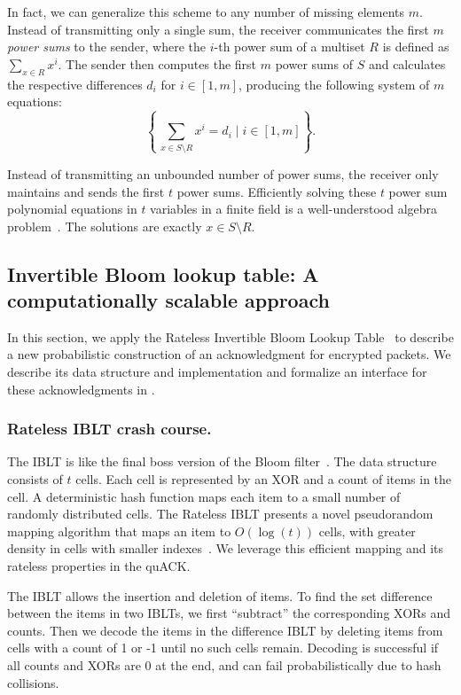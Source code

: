 In fact, we can generalize this scheme to any number of missing elements $m$.
Instead of transmitting only a single sum, the receiver communicates
the first $m$ \emph{power sums} to the sender, where the $i$-th power sum of a
multiset $R$ is defined as $\sum_{x \in R} x^i$.
The sender then computes the first $m$ power sums of $S$ and calculates the
respective differences $d_i$ for $i \in [1,m]$, producing the following
system of $m$ equations:
\[
    \left\{\, \sum_{x \in S\setminus R} x^i = d_i \mid i \in [1,m] \right\}.
\]

Instead of transmitting an unbounded number of power sums, the receiver only
maintains and sends the first $t$ power sums. Efficiently solving these $t$
power sum polynomial equations in $t$ variables in a finite field is a
well-understood algebra problem~\cite{eppstein2011straggler}. The solutions are
exactly $x \in S \setminus R$.

\subsection{Invertible Bloom lookup table: A computationally scalable approach}
\label{sec:quack:constructions:iblt}

In this section, we apply
the Rateless Invertible Bloom Lookup Table~\cite{yang2024practical}
to describe a new probabilistic construction of an acknowledgment
for encrypted packets. We describe its data structure and implementation
and formalize an interface for these acknowledgments in .

\subsubsection{Rateless IBLT crash course.} The IBLT is like the final boss version
 of the Bloom filter~\cite{goodrich2011invertible}. The data structure consists of $t$ cells. Each
 cell is represented by an XOR and a count of items in the cell. A
 deterministic hash function maps each item to a small number of randomly
 distributed cells. The Rateless IBLT presents a novel pseudorandom mapping
 algorithm that maps an item to $O(\log(t))$ cells, with greater density in
 cells with smaller indexes~\cite{yang2024practical}. We leverage this
 efficient mapping and its rateless properties in the quACK.

The IBLT allows the insertion and deletion of items. To find the set difference
between the items in two IBLTs, we first ``subtract'' the corresponding XORs
and counts. Then we decode the items in the difference IBLT by deleting items
from cells with a count of 1 or -1 until no such cells remain. Decoding is
successful if all counts and XORs are 0 at the end, and can fail
probabilistically due to hash collisions.

